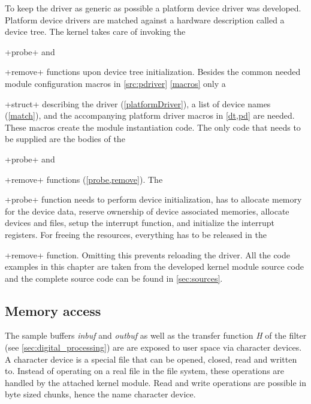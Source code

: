 \documentclass[12pt,a4paper,parskip=full,abstract=true,BCOR=12mm,twoside,open=right]{scrreprt}
\newcommand*{\SavedLstInline}{}
\DeclareRobustCommand*{\lstinline}{%
  \ifmmode
    \let\SavedBGroup\bgroup
    \def\bgroup{%
      \let\bgroup\SavedBGroup
      \hbox\bgroup
    }%
  \fi
  \SavedLstInline
}
\def\device#1{\textit{#1}}
\begin{document}
To keep the driver as generic as possible a platform device driver\cite{platform_device} was
developed. Platform device drivers are matched against a hardware description
called a device tree\cite{platform_device}. The kernel takes care of
invoking the \lstinline+probe+ and \lstinline+remove+ functions upon device tree initialization. Besides
the common needed module configuration macros in \cref{src:pdriver} \cref{macros} only a
\lstinline+struct+ describing the driver (\cref{platformDriver}),
a list of device names (\cref{match}), and the accompanying platform
driver macros in \cref{dt,pd} are needed. These macros create the module
instantiation code. The only code that needs to be supplied are the bodies of
the \lstinline+probe+ and \lstinline+remove+ functions (\cref{probe,remove}). The \lstinline+probe+ function
needs to perform device initialization, has to allocate memory for the
device data, reserve ownership of device associated memories, allocate
devices and files, setup the interrupt function, and initialize the
interrupt registers. For freeing the resources, everything has to be
released in the \lstinline+remove+ function. Omitting this prevents reloading the driver.
All the code examples in this chapter are taken from the developed kernel module source code and the
complete source code can be found in \cref{sec:sources}.


\subsection{Memory access}
\label{sec:memory_access}

The sample buffers \device{inbuf} and \device{outbuf} as well as the transfer
function \device{H} of the filter (see \cref{sec:digital_processing}) are are
exposed to user space via character devices\cite{ldd}. A character device
is a special file that can be opened, closed, read and written to. Instead of
operating on a real file in the file system, these operations are handled by
the attached kernel module. Read and write operations are possible in byte
sized chunks, hence the name character device.
\end{document}
